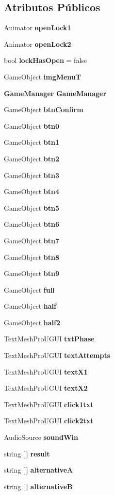 \subsection*{Atributos Públicos}
\begin{DoxyCompactItemize}
\item 
Animator \textbf{ open\+Lock1}
\item 
Animator \textbf{ open\+Lock2}
\item 
bool \textbf{ lock\+Has\+Open} = false
\item 
Game\+Object \textbf{ img\+MenuT}
\item 
\textbf{ Game\+Manager} \textbf{ Game\+Manager}
\item 
Game\+Object \textbf{ btn\+Confirm}
\item 
Game\+Object \textbf{ btn0}
\item 
Game\+Object \textbf{ btn1}
\item 
Game\+Object \textbf{ btn2}
\item 
Game\+Object \textbf{ btn3}
\item 
Game\+Object \textbf{ btn4}
\item 
Game\+Object \textbf{ btn5}
\item 
Game\+Object \textbf{ btn6}
\item 
Game\+Object \textbf{ btn7}
\item 
Game\+Object \textbf{ btn8}
\item 
Game\+Object \textbf{ btn9}
\item 
Game\+Object \textbf{ full}
\item 
Game\+Object \textbf{ half}
\item 
Game\+Object \textbf{ half2}
\item 
Text\+Mesh\+Pro\+U\+G\+UI \textbf{ txt\+Phase}
\item 
Text\+Mesh\+Pro\+U\+G\+UI \textbf{ text\+Attempts}
\item 
Text\+Mesh\+Pro\+U\+G\+UI \textbf{ text\+X1}
\item 
Text\+Mesh\+Pro\+U\+G\+UI \textbf{ text\+X2}
\item 
Text\+Mesh\+Pro\+U\+G\+UI \textbf{ click1txt}
\item 
Text\+Mesh\+Pro\+U\+G\+UI \textbf{ click2txt}
\item 
Audio\+Source \textbf{ sound\+Win}
\item 
string [$\,$] \textbf{ result}
\item 
string [$\,$] \textbf{ alternativeA}
\item 
string [$\,$] \textbf{ alternativeB}

\end{DoxyCompactItemize}
